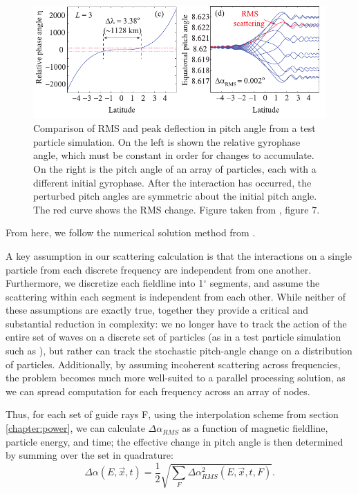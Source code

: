 \begin{figure}[t]
\begin{center}
\includegraphics{figures/Bortnik_RMS_scattering.pdf}
\caption[RMS pitch angle scattering from a test particle simulation]{Comparison of RMS and peak deflection in pitch angle from a test particle simulation. On the left is shown the relative gyrophase angle, which must be constant in order for changes to accumulate. On the right is the pitch angle of an array of particles, each with a different initial gyrophase. After the interaction has occurred, the perturbed pitch angles are symmetric about the initial pitch angle. The red curve shows the RMS change. Figure taken from \cite{Bortnik2006}, figure 7.}
\label{fig:test_particle_sims}
\end{center}
\end{figure}

From here, we follow the numerical solution method from \cite{Bortnik2005, Bortnik2006}. 

A key assumption in our scattering calculation is that the interactions on a single particle from each discrete frequency are independent from one another. Furthermore, we discretize each fieldline into 1$^\circ$ segments, and assume the scattering within each segment is independent from each other. While neither of these assumptions are exactly true, together they provide a critical and substantial reduction in complexity: we no longer have to track the action of the entire set of waves on a discrete set of particles (as in a test particle simulation such as \cite{Chang1985}), but rather can track the stochastic pitch-angle change on a distribution of particles. Additionally, by assuming incoherent scattering across frequencies, the problem becomes much more well-suited to a parallel processing solution, as we can spread computation for each frequency across an array of nodes.

Thus, for each set of guide rays F, using the interpolation scheme from section \ref{chapter:power}, we can calculate $\Delta \alpha_{RMS}$ as a function of magnetic fieldline, particle energy, and time; the effective change in pitch angle is then determined by summing over the set in quadrature: 
\begin{equation}
\Delta \alpha(E, \vec{x}, t) = \frac{1}{2}\sqrt{\sum_{F} \Delta \alpha_{RMS}^2(E, \vec{x},t, F)}.
\end{equation}

